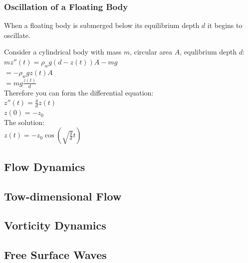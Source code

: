 \subsubsection{Oscillation of a Floating Body}
When a floating body is submerged below its equilibrium depth $d$ it begins to oscillate.
\begin{center}
	Consider a cylindrical body with mass $m$, circular area $A$, equlibrium depth $d$:
	\newline
	\\
	$mz''(t) = \rho_w g (d-z(t))A- mg$
	\\
	$= - \rho_w g z(t)A$
	\\
	$= mg \frac{z(t)}{d}$
	\\
	Therefore you can form the differential equation:
	\\
	$z''(t)= \frac{g}{d}z(t)$
	\\
	$z(0) = -z_0$
	\\
	The solution:
	\\
	$z(t) = -z_0 \cos (\sqrt{\frac{g}{d}} t)$
\end{center}
\subsection{Flow Dynamics}
\subsection{Tow-dimensional Flow}
\subsection{Vorticity Dynamics}
\subsection{Free Surface Waves}